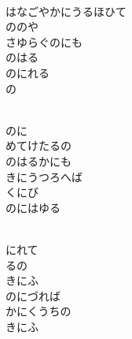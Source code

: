 \documentclass[10pt,b5j]{tarticle} %
\begin{document}
\vspace{1.5em} %
\newcommand{\linespace}{0.5em} %
\newcommand{\blocksize}{0.5\hsize} %
\newcommand{\itemmargin}{3em} %
\begin{enumerate} %
    \setlength{\itemindent}{\itemmargin} %
    \begin{minipage}[c]{\blocksize}
    
        \vspace{\linespace}
        \item~\\
        はなごやかにうるほひて\\
        ののや\\
        さゆらぐのにも\\
        のはる\\
        のにれる\\
        の
        
    \end{minipage}
    \begin{minipage}[c]{\blocksize}
        
        \vspace{\linespace}
        \item~\\
        のに\\
        めてけたるの\\
        のはるかにも\\
        きにうつろへば\\
        くにび\\
        のにはゆる
        
    \end{minipage}
    \begin{minipage}[c]{\blocksize}
        
        \vspace{\linespace}
        \item~\\
        にれて\\
        るの\\
        きにふ\\
        のにづれば\\
        かにくうちの\\
        きにふ
        

\end{minipage}
\end{enumerate}
\end{document}
